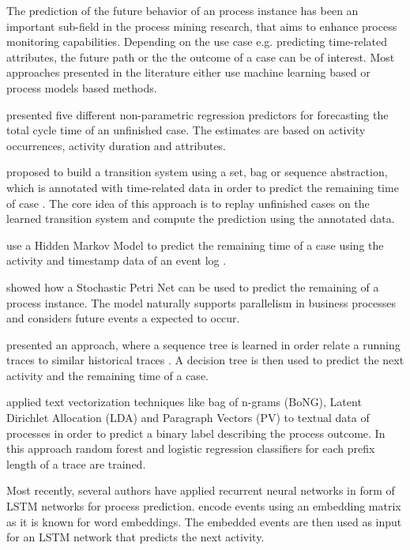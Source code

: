 
The prediction of the future behavior of an process instance has been an important sub-field in the process mining research, that aims to enhance process monitoring capabilities.
Depending on the use case e.g. predicting time-related attributes, the future path or the the outcome of a case can be of interest. 
Most approaches presented in the literature either use machine learning based or process models based methods.

 presented five different non-parametric regression predictors for forecasting the total cycle time of an unfinished case\cite{DBLP:conf/otm/DongenCA08}.
The estimates are based on activity occurrences, activity duration and attributes.

 proposed to build a transition system using a set, bag or sequence abstraction, which is annotated with time-related data in order to predict the remaining time of case \cite{DBLP:journals/is/AalstSS11}.
The core idea of this approach is to replay unfinished cases on the learned transition system and compute the prediction using the annotated data.

\citeauthor{DBLP:conf/colcom/PandeyNC11} use a Hidden Markov Model to predict the remaining time of a case using the activity and timestamp data of an event log \cite{DBLP:conf/colcom/PandeyNC11}.

\citeauthor{DBLP:conf/icsoc/Rogge-SoltiW13} showed how a Stochastic Petri Net can be used to predict the remaining of a process instance.
The model naturally supports parallelism in business processes and considers future events a expected to occur. 

\citeauthor{DBLP:conf/dis/CeciLFCM14} presented an approach, where a sequence tree is learned in order relate a running traces to similar historical traces \cite{DBLP:conf/dis/CeciLFCM14}.
A decision tree is then used to predict the next activity and the remaining time of a case.

\citeauthor{DBLP:conf/bpm/TeinemaaDMF16} applied text vectorization techniques like bag of n-grams (BoNG), Latent Dirichlet Allocation (LDA) and Paragraph Vectors (PV) to textual data of processes in order to predict a binary label describing the process outcome\cite{DBLP:conf/bpm/TeinemaaDMF16}.
In this approach random forest and logistic regression classifiers for each prefix length of a trace are trained.

Most recently, several authors have applied recurrent neural networks in form of LSTM networks for process prediction. \citeauthor{ DBLP:conf/bpm/EvermannRF16} encode events using an embedding matrix as it is known for word embeddings. The embedded events are then used as input for an LSTM network that predicts the next activity\cite{DBLP:conf/bpm/EvermannRF16}.


